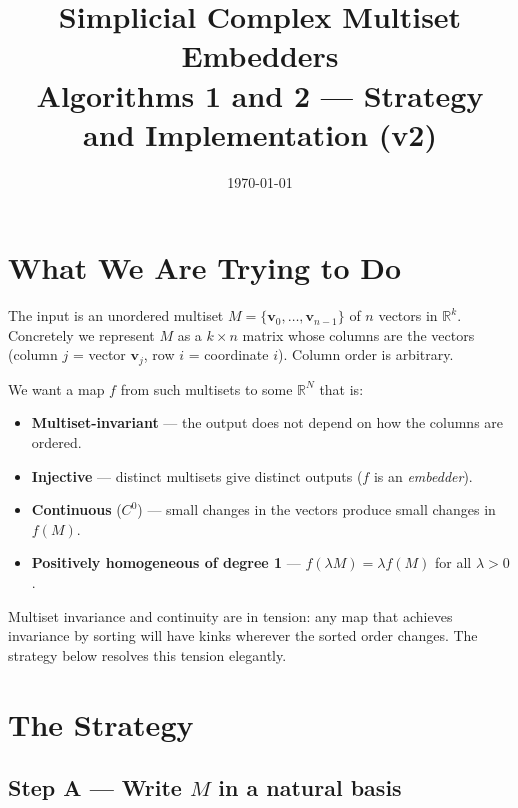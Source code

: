 \documentclass[11pt,a4paper]{article}
\title{\textbf{Simplicial Complex Multiset Embedders}\\[0.4em]
       \large Algorithms 1 and 2 — Strategy and Implementation (v2)}
\date{\today}
\newcommand{\R}{\mathbb{R}}
\begin{document}
\maketitle
\tableofcontents
\bigskip

\section{What We Are Trying to Do}

The input is an unordered multiset $M = \{\mathbf{v}_0,\ldots,\mathbf{v}_{n-1}\}$
of $n$ vectors in $\R^k$.  Concretely we represent $M$ as a $k\times n$ matrix
whose columns are the vectors (column $j$ = vector $\mathbf{v}_j$, row $i$ =
coordinate $i$).  Column order is arbitrary.

We want a map $f$ from such multisets to some $\R^N$ that is:
\begin{itemize}[nosep]
  \item \textbf{Multiset-invariant} — the output does not depend on how the
        columns are ordered.
  \item \textbf{Injective} — distinct multisets give distinct outputs ($f$ is
        an \emph{embedder}).
  \item \textbf{Continuous} ($C^0$) — small changes in the vectors produce
        small changes in $f(M)$.
  \item \textbf{Positively homogeneous of degree 1} — $f(\lambda M) =
        \lambda f(M)$ for all $\lambda > 0$.
\end{itemize}

Multiset invariance and continuity are in tension: any map that achieves
invariance by sorting will have kinks wherever the sorted order changes.
The strategy below resolves this tension elegantly.

\section{The Strategy}
\label{sec:strategy}

\subsection*{Step A — Write $M$ in a natural basis}
\end{document}
